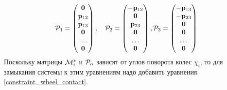 $$ 
\mathcal{P}_1 = \left(
\begin{matrix}
 \boldsymbol{\mathbf{0}} \\
 \mathbf{p}_{12}\\
\mathbf{p}_{13}\\
\boldsymbol{\mathbf{0}}\\
\dots\\
\boldsymbol{\mathbf{0}}
\end{matrix}
\right),\quad
\mathcal{P}_2 = \left(
\begin{matrix}
-\mathbf{p}_{12}\\
\boldsymbol{\mathbf{0}}\\
\mathbf{p}_{23}\\
\boldsymbol{\mathbf{0}}\\
\dots\\
\boldsymbol{\mathbf{0}}
\end{matrix}
\right),
\mathcal{P}_3 = \left(
\begin{matrix}
-\mathbf{p}_{13}\\
-\mathbf{p}_{23}\\
\boldsymbol{\mathbf{0}}\\
\boldsymbol{\mathbf{0}}\\
\dots\\
\boldsymbol{\mathbf{0}}
\end{matrix}
\right)
$$
Поскольку матрицы $\mathcal{M}^*_i$ и $\mathcal{P}_\alpha$ зависят от углов поворота колес $\chi_i$, то для замыкания системы к этим уравнениям надо добавить уравнения
\ref{constraint_wheel_contact}.

